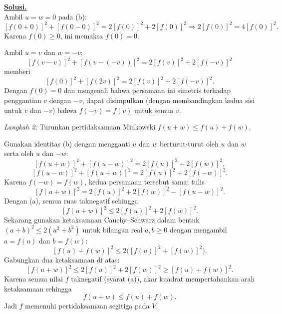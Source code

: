 \documentclass[12pt,twoside]{article}
\newenvironment{solution}
{
	\par\noindent\textbf{\underline{Solusi.}}\\
}
{
	\par
}
\begin{document}
\begin{enumerate}
\begin{solution}
          Ambil $u=w=0$ pada (b):
          \[
            [f(0+0)]^2+[f(0-0)]^2=2[f(0)]^2+2[f(0)]^2\Rightarrow2[f(0)]^2=4[f(0)]^2.
          \]
          Karena $f(0)\ge0$, ini memaksa $f(0)=0$.

          Ambil $u=v$ dan $w=-v$:
          \[
            [f(v-v)]^2+[f(v-(-v))]^2=2[f(v)]^2+2[f(-v)]^2
          \]
          memberi
          \[
            [f(0)]^2+[f(2v)]^2=2[f(v)]^2+2[f(-v)]^2.
          \]
          Dengan $f(0)=0$ dan mengenali bahwa persamaan ini simetris terhadap penggantian $v$ dengan $-v$, dapat disimpulkan (dengan membandingkan kedua sisi untuk $v$ dan $-v$) bahwa $f(-v)=f(v)$ untuk semua $v$.

          \textit{Langkah 2:} Turunkan pertidaksamaan Minkowski $f(u+w)\le f(u)+f(w)$.

          Gunakan identitas (b) dengan mengganti $u$ dan $w$ berturut-turut oleh $u$ dan $w$ serta oleh $u$ dan $-w$:
          \[
            [f(u+w)]^2+[f(u-w)]^2=2[f(u)]^2+2[f(w)]^2,
          \]
          \[
            [f(u-w)]^2+[f(u+w)]^2=2[f(u)]^2+2[f(-w)]^2.
          \]
          Karena $f(-w)=f(w)$, kedua persamaan tersebut sama; tulis
          \[
            [f(u+w)]^2=2[f(u)]^2+2[f(w)]^2-[f(u-w)]^2.
          \]
          Dengan (a), semua ruas taknegatif sehingga
          \[
            [f(u+w)]^2\le2[f(u)]^2+2[f(w)]^2.
          \]
          Sekarang gunakan ketaksamaan Cauchy--Schwarz dalam bentuk $(a+b)^2\le2(a^2+b^2)$ untuk bilangan real $a,b\ge0$ dengan mengambil $a=f(u)$ dan $b=f(w)$:
          \[
            [f(u)+f(w)]^2\le2\bigl([f(u)]^2+[f(w)]^2\bigr).
          \]
          Gabungkan dua ketaksamaan di atas:
          \[
            [f(u+w)]^2\le2[f(u)]^2+2[f(w)]^2\ge[f(u)+f(w)]^2.
          \]
          Karena semua nilai $f$ taknegatif (syarat (a)), akar kuadrat mempertahankan arah ketaksamaan sehingga
          \[
            f(u+w)\le f(u)+f(w).
          \]
          Jadi $f$ memenuhi pertidaksamaan segitiga pada $V$.
        \end{solution}


\end{enumerate}
\end{document}
